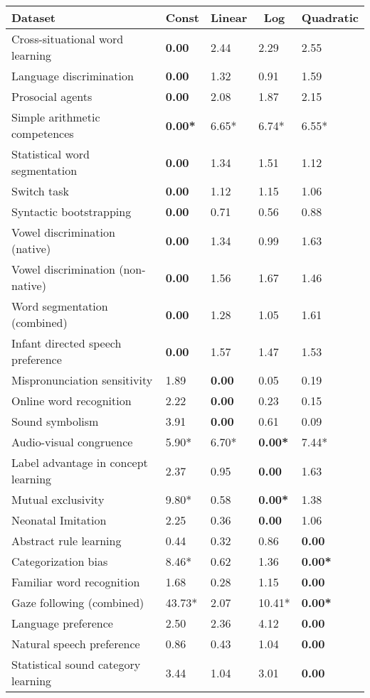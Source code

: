 \documentclass[
  man]{apa6}
\begin{document}
\begin{table*}[hbt]
\ifnextchar[{\eatarg}{}
[tbp]

\begin{center}
\begin{threeparttable}

\caption{\label{tab:unnamed-chunk-10}????}

\begin{tabular}{lllll}
\toprule
Dataset & \multicolumn{1}{c}{Const} & \multicolumn{1}{c}{Linear} & \multicolumn{1}{c}{Log} & \multicolumn{1}{c}{Quadratic}\\
\midrule
Cross-situational word learning & \bf{0.00} & 2.44 & 2.29 & 2.55\\
Language discrimination & \bf{0.00} & 1.32 & 0.91 & 1.59\\
Prosocial agents & \bf{0.00} & 2.08 & 1.87 & 2.15\\
Simple arithmetic competences & \bf{0.00*} & 6.65* & 6.74* & 6.55*\\
Statistical word segmentation & \bf{0.00} & 1.34 & 1.51 & 1.12\\
Switch task & \bf{0.00} & 1.12 & 1.15 & 1.06\\
Syntactic bootstrapping & \bf{0.00} & 0.71 & 0.56 & 0.88\\
Vowel discrimination (native) & \bf{0.00} & 1.34 & 0.99 & 1.63\\
Vowel discrimination (non-native) & \bf{0.00} & 1.56 & 1.67 & 1.46\\
Word segmentation (combined) & \bf{0.00} & 1.28 & 1.05 & 1.61\\
Infant directed speech preference & \bf{0.00} & 1.57 & 1.47 & 1.53\\
Mispronunciation sensitivity & 1.89 & \bf{0.00} & 0.05 & 0.19\\
Online word recognition & 2.22 & \bf{0.00} & 0.23 & 0.15\\
Sound symbolism & 3.91 & \bf{0.00} & 0.61 & 0.09\\
Audio-visual congruence & 5.90* & 6.70* & \bf{0.00*} & 7.44*\\
Label advantage in concept learning & 2.37 & 0.95 & \bf{0.00} & 1.63\\
Mutual exclusivity & 9.80* & 0.58 & \bf{0.00*} & 1.38\\
Neonatal Imitation & 2.25 & 0.36 & \bf{0.00} & 1.06\\
Abstract rule learning & 0.44 & 0.32 & 0.86 & \bf{0.00}\\
Categorization bias & 8.46* & 0.62 & 1.36 & \bf{0.00*}\\
Familiar word recognition & 1.68 & 0.28 & 1.15 & \bf{0.00}\\
Gaze following (combined) & 43.73* & 2.07 & 10.41* & \bf{0.00*}\\
Language preference & 2.50 & 2.36 & 4.12 & \bf{0.00}\\
Natural speech preference & 0.86 & 0.43 & 1.04 & \bf{0.00}\\
Statistical sound category learning & 3.44 & 1.04 & 3.01 & \bf{0.00}\\
\bottomrule
\end{tabular}


\end{threeparttable}
\end{center}
\end{table*}
\end{document}
